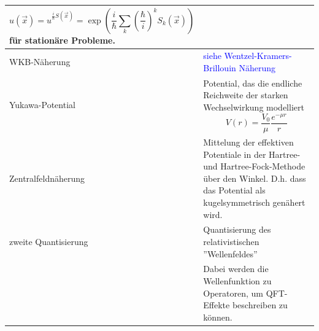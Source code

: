 \documentclass{article}
\newcommand{\lr}[1]{\left(#1\right)}
\begin{document}
\begin{xltabular}{\linewidth}{p{6cm}|X}
			$$u(\vec{x}) = u^{\frac{i}{\hbar}S(\vec{x})} = \exp \lr{\frac{i}{\hbar} \sum_k \lr{\frac{\hbar}{i}}^k S_k(\vec{x})}$$
		für stationäre Probleme. \\
	\hline
		WKB-Näherung & \textcolor{blue}{siehe Wentzel-Kramers-Brillouin Näherung} \\
	\hline
		Yukawa-Potential & Potential, das die endliche Reichweite der starken Wechselwirkung modelliert
			$$V(r) = \frac{V_0}{\mu}\frac{e^{-\mu r}}{r}$$ \\
	\hline
		Zentralfeldnäherung & Mittelung der effektiven Potentiale in der Hartree- und Hartree-Fock-Methode über den Winkel. D.h. dass das Potential als kugelsymmetrisch genähert wird. \\
	\hline
		zweite Quantisierung & Quantisierung des relativistischen ''Wellenfeldes'' \\
		& Dabei werden die Wellenfunktion zu Operatoren, um QFT-Effekte beschreiben zu können. \\
	\hline\hline
\end{xltabular}
\end{document}
